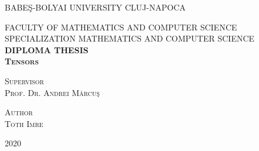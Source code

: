 \documentclass[12pt,a4paper]{article}
\begin{document}
\begin{titlepage}
\begin{center}

\textsc{ \large BABEŞ-BOLYAI UNIVERSITY CLUJ-NAPOCA}\\\medskip

\textsc{\large FACULTY OF MATHEMATICS AND COMPUTER SCIENCE}\\\medskip
\textsc{\large SPECIALIZATION MATHEMATICS AND COMPUTER SCIENCE }\\[4 cm]

\textsc{\LARGE\textbf{DIPLOMA THESIS} }\\[1 cm]
\textsc{\LARGE\textbf{Tensors}}\\[7 cm]
\begin{flushleft}
\textsc{\Large Supervisor}\\
\textsc{\Large Prof. Dr. Andrei Mărcuş }\\[2 cm]
\end{flushleft}
\begin{flushright}
\textsc{\Large Author}\\
\textsc{\Large Toth Imre}\\[3 cm]
\end{flushright}
\textsc{\Large 2020}
\end{center}
\end{titlepage}
\renewcommand{\contentsname}{Cuprins}
\renewcommand{\refname}{Bibliografie}
\setcounter{page}{0}
\tableofcontents
\newpage
\end{document}
